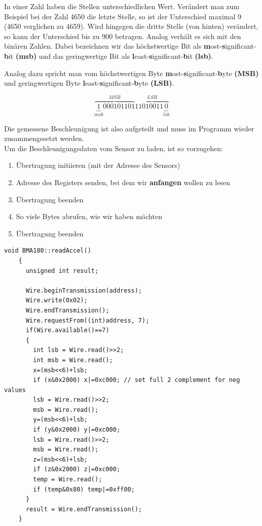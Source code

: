 \documentclass[12pt,a4paper,twoside,BCOR=12.5mm]{scrartcl}
\begin{document}
In einer Zahl haben die Stellen unterschiedlichen Wert. Verändert man zum Beispiel bei der Zahl 4650 die letzte Stelle, so ist der Unterschied maximal 9 (4650 verglichen zu 4659). Wird hingegen die dritte Stelle (von hinten) verändert, so kann der Unterschied bis zu 900 betragen. Analog verhält es sich mit den binären Zahlen. 
Dabei bezeichnen wir das höchstwertige Bit als \textbf{m}ost-\textbf{s}ignificant-\textbf{b}it \textbf{(msb)} und das geringwertige Bit als \textbf{l}east-\textbf{s}ignificant-\textbf{b}it \textbf{(lsb)}.

Analog dazu spricht man vom höchstwertigen Byte \textbf{m}ost-\textbf{s}ignificant-\textbf{b}yte \textbf{(MSB)} und geringwertigen Byte \textbf{l}east-\textbf{s}ignificant-\textbf{b}yte \textbf{(LSB)}.

\begin{equation}
\overbrace {\underbrace{1}_{msb}000101101}^{MSB}\overbrace {11010011\underbrace{0}_{lsb}}^{LSB}
\end{equation}

Die gemessene Beschleunigung ist also aufgeteilt und muss im Programm wieder zusammengesetzt werden. \\

Um die Beschleunigungsdaten vom Sensor zu laden, ist so vorzugehen:
\begin{enumerate}
	\item Übertragung initiieren (mit der Adresse des Sensors)
	\item Adresse des Registers senden, bei dem wir \textbf{anfangen} wollen zu lesen
	\item Übertragung beenden
	\item So viele Bytes abrufen, wie wir haben möchten
	\item Übertragung beenden
\end{enumerate}

\begin{lstlisting}[frame=trBL]
	void BMA180::readAccel()
	{
	  unsigned int result;

	  Wire.beginTransmission(address);
	  Wire.write(0x02);
	  Wire.endTransmission();
	  Wire.requestFrom((int)address, 7);
	  if(Wire.available()==7)
	  {
	    int lsb = Wire.read()>>2;
	    int msb = Wire.read();
	    x=(msb<<6)+lsb; 
	    if (x&0x2000) x|=0xc000; // set full 2 complement for neg values
	    lsb = Wire.read()>>2;
	    msb = Wire.read();
	    y=(msb<<6)+lsb;
	    if (y&0x2000) y|=0xc000;
	    lsb = Wire.read()>>2;
	    msb = Wire.read();
	    z=(msb<<6)+lsb;
	    if (z&0x2000) z|=0xc000;
	    temp = Wire.read();
	    if (temp&0x80) temp|=0xff00;
	  }
	  result = Wire.endTransmission();
	}
\end{lstlisting}
\end{document}
